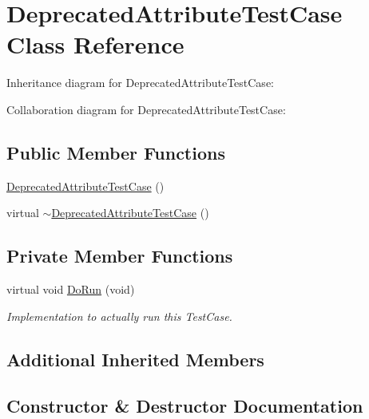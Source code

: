 \hypertarget{classDeprecatedAttributeTestCase}{}\section{Deprecated\+Attribute\+Test\+Case Class Reference}
\label{classDeprecatedAttributeTestCase}


Inheritance diagram for Deprecated\+Attribute\+Test\+Case\+:


Collaboration diagram for Deprecated\+Attribute\+Test\+Case\+:
\subsection*{Public Member Functions}
\begin{DoxyCompactItemize}
\item 
\hyperlink{classDeprecatedAttributeTestCase_a44e6d63760dd64b47ec42685bc5c2954}{Deprecated\+Attribute\+Test\+Case} ()
\item 
virtual \hyperlink{classDeprecatedAttributeTestCase_a44129f70674bcd62d7d16057e30a7326}{$\sim$\+Deprecated\+Attribute\+Test\+Case} ()
\end{DoxyCompactItemize}
\subsection*{Private Member Functions}
\begin{DoxyCompactItemize}
\item 
virtual void \hyperlink{classDeprecatedAttributeTestCase_a082dd0381220ff75bd0ef8e7708869e4}{Do\+Run} (void)
\begin{DoxyCompactList}\small\item\em Implementation to actually run this Test\+Case. \end{DoxyCompactList}\end{DoxyCompactItemize}
\subsection*{Additional Inherited Members}


\subsection{Constructor \& Destructor Documentation}
